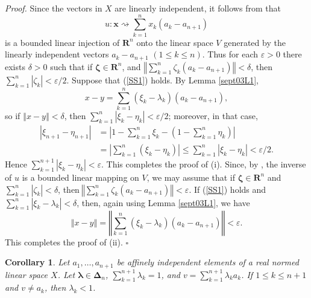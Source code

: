 \documentclass[11pt]{article}%
\newtheorem{corollary}[theorem]{Corollary}
\newenvironment{proof}[1][Proof]{\noindent\textit{#1.} }{}
\begin{document}
\begin{proof}
Since the vectors in $X$ are linearly independent, it follows from
\cite[4.1.8]{BVtech} that
\[
u:\mathbf{x}\rightsquigarrow\sum_{k=1}^{n}x_{k}\left(  a_{k}-a_{n+1}\right)
\]
is a bounded linear injection of $\mathbf{R}^{n}$ onto the linear space $V$
generated by the linearly independent vectors $a_{k}-a_{n+1}$ $(1\leq k\leq
n)$. Thus for each $\varepsilon>0$ there exists $\delta>0$ such that if
$\mathbf{\zeta}\in\mathbf{R}^{n}$, and $\left\Vert \sum_{k=1}^{n}\zeta
_{k}\left(  a_{k}-a_{n+1}\right)  \right\Vert <\delta$, then $\sum_{k=1}%
^{n}\left\vert \zeta_{k}\right\vert <\varepsilon/2$. Suppose that (\ref{SS1})
holds. By Lemma \ref{sept03L1},%
\[
x-y=\sum_{k=1}^{n}\left(  \xi_{k}-\lambda_{k}\right)  (a_{k}-a_{n+1}),
\]
so if $\left\Vert x-y\right\Vert <\delta$, then $\sum_{k=1}^{n}\left\vert
\xi_{k}-\eta_{k}\right\vert <\varepsilon/2$; moreover, in that case,%
\begin{align*}
\left\vert \xi_{n+1}-\eta_{n+1}\right\vert  &  =\left\vert 1-\sum_{k=1}^{n}%
\xi_{k}-\left(  1-\sum_{k=1}^{n}\eta_{k}\right)  \right\vert \\
&  =\left\vert \sum_{k=1}^{n}\left(  \xi_{k}-\eta_{k}\right)  \right\vert
\leq\sum_{k=1}^{n}\left\vert \xi_{k}-\eta_{k}\right\vert <\varepsilon/2.
\end{align*}
Hence $\sum_{k=1}^{n+1}\left\vert \xi_{k}-\eta_{k}\right\vert <\varepsilon$.
This completes the proof of (i). Since, by \cite[4.1.8]{BVtech}, the inverse
of $u$ is a bounded linear mapping on $V$, we may assume that if
$\mathbf{\zeta}\in\mathbf{R}^{n}$ and $\sum_{k=1}^{n}\left\vert \zeta
_{k}\right\vert <\delta$, then$\ \left\Vert \sum_{k=1}^{n}\zeta_{k}\left(
a_{k}-a_{n+1}\right)  \right\Vert <\varepsilon$. If (\ref{SS1}) holds and
$\sum_{k=1}^{n}\left\vert \xi_{k}-\lambda_{k}\right\vert <\delta$, then, again
using Lemma \ref{sept03L1}, we have
\[
\left\Vert x-y\right\Vert =\left\Vert \sum_{k=1}^{n}\left(  \xi_{k}%
-\lambda_{k}\right)  (a_{k}-a_{n+1})\right\Vert <\varepsilon\text{.}%
\]
This completes the proof of (ii).%
\hfill
$\square$
\end{proof}

\begin{corollary}
\label{sept18c1}Let $a_{1},\ldots,a_{n+1}$ be affinely independent elements of
a real normed linear space $X$. Let $\mathbf{\lambda}\in\mathbf{\Delta}_{n}$,
$\sum_{k=1}^{n+1}\lambda_{k}=1$, and $v=\sum_{k=1}^{n+1}\lambda_{k}a_{k}$. If
$1\leq k\leq n+1$ and $v\neq a_{k}$, then $\lambda_{k}<1$.
\end{corollary}
\end{document}

